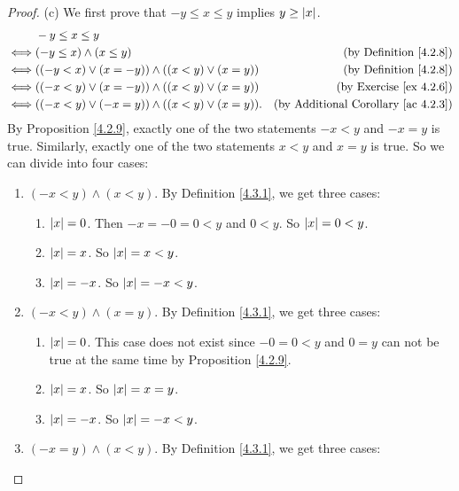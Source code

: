 \begin{proof}{(c)}
We first prove that \(-y \leq x \leq y\) implies \(y \geq \abs*{x}\).
\begin{align*}
& -y \leq x \leq y \\
\iff & (-y \leq x) \land (x \leq y) & \text{(by Definition \ref{4.2.8})} \\
\iff & ((-y < x) \lor (x = -y)) \land ((x < y) \lor (x = y)) & \text{(by Definition \ref{4.2.8})} \\
\iff & ((-x < y) \lor (x = -y)) \land ((x < y) \lor (x = y)) & \text{(by Exercise \ref{ex 4.2.6})} \\
\iff & ((-x < y) \lor (-x = y)) \land ((x < y) \lor (x = y)). & \text{(by Additional Corollary \ref{ac 4.2.3})}
\end{align*}
By Proposition \ref{4.2.9}, exactly one of the two statements \(-x < y\) and \(-x = y\) is true.
Similarly, exactly one of the two statements \(x < y\) and \(x = y\) is true.
So we can divide into four cases:
\begin{enumerate}[label=(\Roman*)]
    \item \((-x < y) \land (x < y)\).
    By Definition \ref{4.3.1}, we get three cases:
    \begin{enumerate}[label=(\roman*)]
        \item \(\abs*{x} = 0\).
        Then \(-x = -0 = 0 < y\) and \(0 < y\).
        So \(\abs*{x} = 0 < y\).
        \item \(\abs*{x} = x\).
        So \(\abs*{x} = x < y\).
        \item \(\abs*{x} = -x\).
        So \(\abs*{x} = -x < y\).
    \end{enumerate}
    \item \((-x < y) \land (x = y)\).
    By Definition \ref{4.3.1}, we get three cases:
    \begin{enumerate}[label=(\roman*)]
        \item \(\abs*{x} = 0\).
        This case does not exist since \(-0 = 0 < y\) and \(0 = y\) can not be true at the same time by Proposition \ref{4.2.9}.
        \item \(\abs*{x} = x\).
        So \(\abs*{x} = x = y\).
        \item \(\abs*{x} = -x\).
        So \(\abs*{x} = -x < y\).
    \end{enumerate}
    \item \((-x = y) \land (x < y)\).
    By Definition \ref{4.3.1}, we get three cases:
    \begin{enumerate}[label=(\roman*)]

\end{enumerate}
\end{enumerate}
\end{proof}
